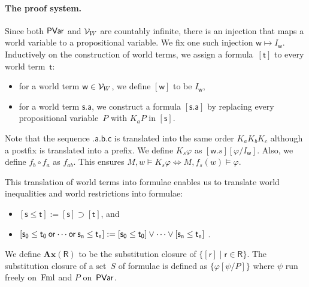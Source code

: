     \paragraph{The proof system.}
    Since both $\mathsf{PVar}$ and $\mathcal V_W$ are countably infinite,
    there is an injection that maps a world variable to a propositional
    variable.
    We fix one such injection
    $\mathsf w\mapsto I_{\mathsf w}$.
    Inductively on the construction of world terms,
    we assign a formula~$[\mathsf t]$ to every world term~$\mathsf t$:
    \begin{itemize}
     \item for a world term $\mathsf w\in \mathcal V_W$, we define $[\mathsf w]$ to be
	   $I_{\mathsf w}$,
     \item for a world term $\mathsf{s.a}$, we construct
	   a formula $[\mathsf{s.a}]$ by
	   replacing every propositional variable~$P$ with $K_aP$ in $[\mathsf s]$.
    \end{itemize}
    Note that the sequence $\mathsf{.a.b.c}$ is translated into the same
    order $K_a K_b K_c$ although a postfix is translated into a prefix.
    We define $K_s\varphi$ as $[\mathsf w.s][\varphi/I_{\mathsf w}]$.
    Also, we define $f_b\circ f_a$ as $f_{ab}$.  This ensures $M, w\models
    K_s\varphi\Leftrightarrow M,f_s(w)\models\varphi$.

    This translation of world terms into formulae
    enables us to translate world inequalities and world restrictions
    into formulae:
    \begin{itemize}
     \item $[\mathsf s\le \mathsf t] := [\mathsf s]\supset [\mathsf t]$, and
     \item $[\mathsf{s_0}\le \mathsf{t_0}\mathbin{\mathsf{or}} \cdots\mathbin{\mathsf{or}} \mathsf{s_n}\le \mathsf{t_n}] := [\mathsf{s_0}\le \mathsf{t_0}]\vee
	   \cdots \vee [\mathsf{s_n}\le \mathsf{t_n}]$ \enspace.
    \end{itemize}

    We define $\mathbf{Ax}(\mathsf R)$ to be the substitution closure of
    $\{[\mathsf r]\mid \mathsf r\in \mathsf R\}$.
    The substitution closure of a set~$S$ of formulae is defined as
    $\{\varphi[\psi/P]\}$ where $\psi$ run freely on~$\mathsf{\operatorname{Fml}}$ and $P$ on~$\mathsf{PVar}$.

